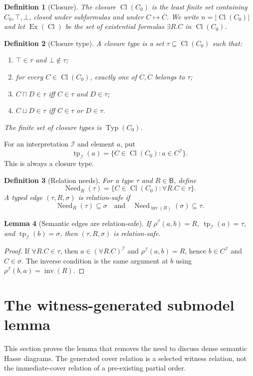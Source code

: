 \documentclass[11pt]{article}
\newtheorem{definition}{Definition}[section]
\newtheorem{lemma}[definition]{Lemma}
\theoremstyle{remark}
\newcommand{\Base}{\mathsf{B}}
\newcommand{\Inv}{\operatorname{inv}}
\newcommand{\Cl}{\operatorname{Cl}}
\newcommand{\Typ}{\operatorname{Typ}}
\newcommand{\tp}{\operatorname{tp}}
\newcommand{\Need}{\operatorname{Need}}
\newcommand{\Ex}{\operatorname{Ex}}
\newcommand{\I}{\mathcal{I}}
\begin{document}
\begin{definition}[Closure]
The closure $\Cl(C_0)$ is the least finite set containing $C_0,\top,\bot$, closed under subformulas and under $C\mapsto\overline C$.  We write $n=|\Cl(C_0)|$ and let $\Ex(\Cl)$ be the set of existential formulas $\exists R.C$ in $\Cl(C_0)$.
\end{definition}

\begin{definition}[Closure type]
A closure type is a set $\tau\subseteq\Cl(C_0)$ such that:
\begin{enumerate}[label=(T\arabic*)]
\item $\top\in\tau$ and $\bot\notin\tau$;
\item for every $C\in\Cl(C_0)$, exactly one of $C,\overline C$ belongs to $\tau$;
\item $C\sqcap D\in\tau$ iff $C\in\tau$ and $D\in\tau$;
\item $C\sqcup D\in\tau$ iff $C\in\tau$ or $D\in\tau$.
\end{enumerate}
The finite set of closure types is $\Typ(C_0)$.
\end{definition}

For an interpretation $\I$ and element $a$, put
\[
\tp_\I(a)=\{C\in\Cl(C_0):a\in C^\I\}.
\]
This is always a closure type.

\begin{definition}[Relation needs]
For a type $\tau$ and $R\in\Base$, define
\[
\Need_R(\tau)=\{C\in\Cl(C_0):\forall R.C\in\tau\}.
\]
A typed edge $(\tau,R,\sigma)$ is relation-safe if
\[
\Need_R(\tau)\subseteq\sigma
\quad\text{and}\quad
\Need_{\Inv(R)}(\sigma)\subseteq\tau.
\]
\end{definition}

\begin{lemma}[Semantic edges are relation-safe]\label{lem:safe-edges}
If $\rho^\I(a,b)=R$, $\tp_\I(a)=\tau$, and $\tp_\I(b)=\sigma$, then $(\tau,R,\sigma)$ is relation-safe.
\end{lemma}
\begin{proof}
If $\forall R.C\in\tau$, then $a\in(\forall R.C)^\I$ and $\rho^\I(a,b)=R$, hence $b\in C^\I$ and $C\in\sigma$.  The inverse condition is the same argument at $b$ using $\rho^\I(b,a)=\Inv(R)$.
\end{proof}

\section{The witness-generated submodel lemma}
This section proves the lemma that removes the need to discuss dense semantic Hasse diagrams.  The generated cover relation is a selected witness relation, not the immediate-cover relation of a pre-existing partial order.
\end{document}
